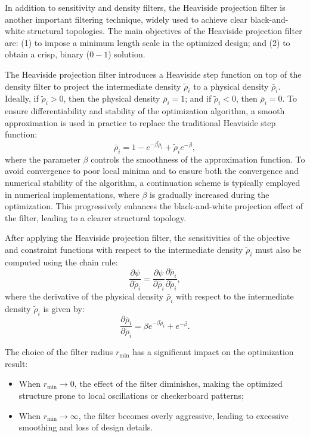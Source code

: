\documentclass[mathpazo]{cicp}
\begin{document}
In addition to sensitivity and density filters, the Heaviside projection filter is another important filtering technique, widely used to achieve clear black-and-white structural topologies\cite{guest2004achieving}. The main objectives of the Heaviside projection filter are: (1) to impose a minimum length scale in the optimized design; and (2) to obtain a crisp, binary ($0-1$) solution.

The Heaviside projection filter introduces a Heaviside step function on top of the density filter to project the intermediate density $\tilde{\rho}_i$ to a physical density $\bar{\rho}_i$.  Ideally, if $\tilde{\rho}_i > 0$, then the physical density $\bar{\rho}_i = 1$; and if $\tilde{\rho}_i < 0$, then $\bar{\rho}_i = 0$. To ensure differentiability and stability of the optimization algorithm, a smooth approximation is used in practice to replace the traditional Heaviside step function:
\begin{equation*}
	\bar\rho_i= 1 - e^{-\beta\tilde\rho_i} + \tilde\rho_ie^{-\beta},
\end{equation*}
where the parameter $\beta$ controls the smoothness of the approximation function. To avoid convergence to poor local minima and to ensure both the convergence and numerical stability of the algorithm, a continuation scheme is typically employed in numerical implementations, where $\beta$ is gradually increased during the optimization. This progressively enhances the black-and-white projection effect of the filter, leading to a clearer structural topology.

After applying the Heaviside projection filter, the sensitivities of the objective and constraint functions with respect to the intermediate density $\tilde{\rho}_i$ must also be computed using the chain rule: 
\begin{equation*}
	\frac{\partial\psi}{\partial\tilde\rho_i} = \frac{\partial\psi}{\partial\bar\rho_i} \frac{\partial\bar\rho_i}{\partial\tilde\rho_i},
\end{equation*} 
where the derivative of the physical density $\bar{\rho}_i$ with respect to the intermediate density $\tilde{\rho}_i$ is given by:
\begin{equation*}
	\frac{\partial\bar\rho_i}{\partial\tilde\rho_i} = \beta{e}^{-\beta\tilde\rho_i} + e^{-\beta}.
\end{equation*}

The choice of the filter radius $r_{\min}$ has a significant impact on the optimization result: 
\begin{itemize} 
	\item When $r_{\min} \to 0$, the effect of the filter diminishes, making the optimized structure prone to local oscillations or checkerboard patterns; 
	\item When $r_{\min} \to \infty$, the filter becomes overly aggressive, leading to excessive smoothing and loss of design details. 
\end{itemize}
\end{document}
